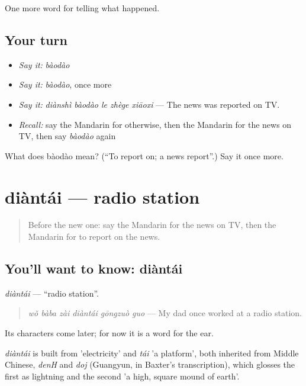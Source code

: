 \begin{grammarlens}[title={What you've built}]
One more word for telling what happened.
\end{grammarlens}

\subsection*{Your turn}
\begin{itemize}
\raggedright
  \item \emph{Say it:} \emph{bàodào}
  \item \emph{Say it:} \emph{bàodào}, once more
  \item \emph{Say it:} \emph{diànshì bàodào le zhège xiāoxi} — The news was reported on TV.
  \item \emph{Recall:} say the Mandarin for otherwise, then the Mandarin for the news on TV, then say \emph{bàodào} again
\end{itemize}

\begin{tcolorbox}[breakable,colback=teal!4,colframe=teal!35!black,title={Before you move on}]
What does bàodào mean? (\textquotedblleft{}To report on; a news report\textquotedblright{}.) Say it once more.
\end{tcolorbox}
\section[diàntái]{diàntái — radio station}

\label{lesson:ZH-C290-diantai}



\begin{quote}
Before the new one: say the Mandarin for the news on TV, then the Mandarin for to report on the news.
\end{quote}

\subsection*{You'll want to know: diàntái}
\emph{diàntái} — \textquotedblleft{}radio station\textquotedblright{}.

\begin{quote}
\emph{wǒ bàba zài diàntái gōngzuò guo} — My dad once worked at a radio station.
\end{quote}

Its characters come later; for now it is a word for the ear.

\begin{cousinweb}
\emph{diàntái} is built from  'electricity' and \emph{tái} 'a platform', both inherited from Middle Chinese, \emph{denH} and \emph{doj} (Guangyun, in Baxter's transcription), which glosses the first as lightning and the second 'a high, square mound of earth'.
\end{cousinweb}

